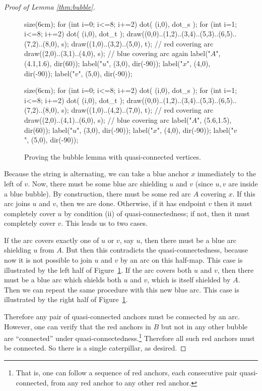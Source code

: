 \begin{proof}[Proof of Lemma \ref{thm:bubble}]
	\begin{figure}[ht]
		\centering
		\begin{asy}
			size(6cm);
			for (int i=0; i<=8; i+=2) { dot( (i,0), dot_s ); }
			for (int i=1; i<=8; i+=2) { dot( (i,0), dot_t ); }
			draw((0,0)..(1,2)..(3,4)..(5,3)..(6,5)..(7,2)..(8,0), s);
			draw((1,0)..(3,2)..(5,0), t); // red covering arc
			draw((2,0)..(3,1)..(4,0), s); // blue covering arc again
			label("$A$", (4.1,1.6), dir(60));
			label("$u$", (3,0), dir(-90));
			label("$x$", (4,0), dir(-90));
			label("$v$", (5,0), dir(-90));
		\end{asy}
		\hspace{2em}
		\begin{asy}
			size(6cm);
			for (int i=0; i<=8; i+=2) { dot( (i,0), dot_s ); }
			for (int i=1; i<=8; i+=2) { dot( (i,0), dot_t ); }
			draw((0,0)..(1,2)..(3,4)..(5,3)..(6,5)..(7,2)..(8,0), s);
			draw((1,0)..(4,2)..(7,0), t); // red covering arc
			draw((2,0)..(4,1)..(6,0), s); // blue covering arc
			label("$A$", (5.6,1.5), dir(60));
			label("$u$", (3,0), dir(-90));
			label("$x$", (4,0), dir(-90));
			label("$v$", (5,0), dir(-90));
		\end{asy}
		\caption{Proving the bubble lemma with quasi-connected vertices.}
		\label{fig:pf_bubble}
	\end{figure}
	Because the string is alternating, we can take a blue anchor $x$ immediately to the left of $v$.  Now, there must be some blue arc shielding $u$ and $v$ (since $u,v$ are inside a blue bubble).  By construction, there must be some red arc $A$ covering $x$.  If this arc joins $u$ and $v$, then we are done.  
	Otherwise, if it has endpoint $v$ then it must completely cover $u$ by condition (ii) of quasi-connectedness; if not, then it must completely cover $v$.  This leads us to two cases.
	\begin{itemize}
		\ii If the arc covers exactly one of $u$ or $v$, say $u$, then there must be a blue arc shielding $u$ from $A$.  But then this contradicts the quasi-connectedness, because now it is not possible to join $u$ and $v$ by an arc on this half-map.  This case is illustrated by the left half of Figure~\ref{fig:pf_bubble}.
		\ii If the arc covers both $u$ and $v$, then there must be a blue arc which shields both $u$ and $v$, which is itself shielded by $A$.  Then we can repeat the same procedure with this new blue arc.  This case is illustrated by the right half of Figure~\ref{fig:pf_bubble}.
	\end{itemize}
	Therefore any pair of quasi-connected anchors must be connected by an arc.  However, one can verify that the red anchors in $B$ but not in any other bubble are ``connected'' under quasi-connectedness.\footnote{That is, one can follow a sequence of red anchors, each consecutive pair quasi-connected, from any red anchor to any other red anchor.}  Therefore all such red anchors must be connected.  So there is a single caterpillar, as desired.
\end{proof}

